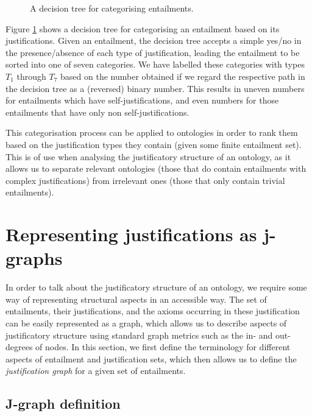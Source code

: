 \begin{figure}
\centering

\caption{A decision tree for categorising entailments.}
\label{fig:entailmenthierarchy}
\end{figure}

Figure \ref{fig:entailmenthierarchy} shows a decision tree for categorising an entailment based on its justifications. Given an entailment, the decision tree accepts a simple yes/no in the presence/absence of each type of justification, leading the entailment to be sorted into one of seven categories. We have labelled these categories with types $T_{1}$ through $T_{7}$ based on the number obtained if we regard the respective path in the decision tree as a (reversed) binary number. This results in uneven numbers for entailments which have self-justifications, and even numbers for those entailments that have only non self-justifications. 

This categorisation process can be applied to ontologies in order to rank them based on the justification types they contain (given some finite entailment set). This is of use when analysing the justificatory structure of an ontology, as it allows us to separate relevant ontologies (those that do contain entailments with complex justifications) from irrelevant ones (those that only contain trivial entailments). 



\section{Representing justifications as j-graphs}

In order to talk about the justificatory structure of an ontology, we require some way of representing structural aspects in an accessible way. The set of entailments, their justifications, and the axioms occurring in these justification can be easily represented as a graph, which allows us to describe aspects of justificatory structure using standard graph metrics such as the in- and out-degrees of nodes. In this section, we first define the terminology for different aspects of entailment and justification sets, which then allows us to define the \emph{justification graph} for a given set of entailments.


\subsection{J-graph definition}

